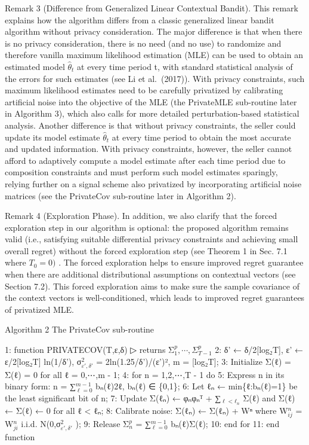 Remark 3 (Difference from Generalized Linear Contextual Bandit). This remark explains how the algorithm differs from a classic generalized linear bandit algorithm without privacy consideration. The major difference is that when there is no privacy consideration, there is no need (and no use) to randomize and therefore vanilla maximum likelihood estimation (MLE) can be used to obtain an estimated model \(\widehat { \theta } _ { t }\) at every time period t, with standard statistical analysis of the errors for such estimates (see Li et al.~(2017)). With privacy constraints, such maximum likelihood estimates need to be carefully privatized by calibrating artificial noise into the objective of the MLE (the PrivateMLE sub-routine later in Algorithm 3), which also calls for more detailed perturbation-based statistical analysis. Another difference is that without privacy constraints, the seller could update its model estimate \(\widehat { \theta } _ { t }\) at every time period to obtain the most accurate and updated information. With privacy constraints, however, the seller cannot afford to adaptively compute a model estimate after each time period due to composition constraints and must perform such model estimates sparingly, relying further on a signal scheme also privatized by incorporating artificial noise matrices (see the PrivateCov sub-routine later in Algorithm 2).

Remark 4 (Exploration Phase). In addition, we also clarify that the forced exploration step in our algorithm is optional: the proposed algorithm remains valid (i.e., satisfying suitable differential privacy constraints and achieving small overall regret) without the forced exploration step (see Theorem 1 in Sec. 7.1 where \(T _ { 0 } = 0 )\) . The forced exploration helps to ensure improved regret guarantee when there are additional distributional assumptions on contextual vectors (see Section 7.2). This forced exploration aims to make sure the sample covariance of the context vectors is well-conditioned, which leads to improved regret guarantees of privatized MLE.

Algorithm 2 The PrivateCov sub-routine

1: function PRIVATECOV(T,ε,δ) ▷ returns Σ\(_{1}^{p},\cdots,\Sigma_{T-1}^{p}\) 
2: δ' ← δ/2{[}log₂T{]}, ε' ← ε/2{[}log₂T{]} ln(1/δ'), σ\(_{\varepsilon',\delta'}^{2}\) = 2ln(1.25/δ')/(ε')², m = {[}log₂T{]}; 
3: Initialize Σ(ℓ) = Σ(ℓ) = 0 for all ℓ = 0,⋯,m - 1; 
4: for n = 1,2,⋯,T - 1 do 
5: Express n in its binary form: n = ∑\(_{\ell=0}^{m-1}\) bₙ(ℓ)2ℓ, bₙ(ℓ) ∈ \{0,1\}; 
6: Let ℓₙ ← min\{ℓ:bₙ(ℓ)=1\} be the least significant bit of n; 
7: Update Σ(ℓₙ) ← φₙφₙᵀ + ∑\(_{\ell<ℓ_n}\) Σ(ℓ) and Σ(ℓ) ← Σ(ℓ) ← 0 for all ℓ < ℓₙ; 
8: Calibrate noise: Σ(ℓₙ) ← Σ(ℓₙ) + Wⁿ where W\(_{ij}^{n}\) = W\(_{ji}^{n}\) i.i.d. N(0,σ\(_{\varepsilon',\delta'}^{2}\) ); 
9: Release Σ\(_{n}^{p}\) = ∑\(_{\ell=0}^{m-1}\) bₙ(ℓ)Σ(ℓ); 
10: end for 
11: end function

